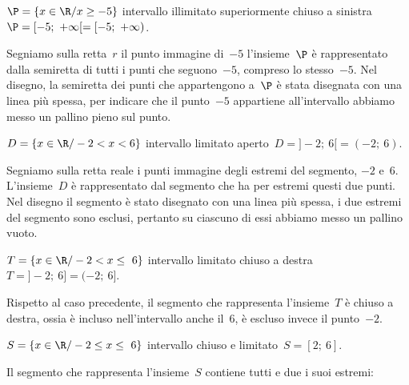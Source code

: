 \begin{esempio}{}{}
\(\P=\{x\in \R/x\ge -5\}\) intervallo illimitato superiormente chiuso 
a sinistra~\(\P = [-5;~+\infty[ = [-5;~+\infty)\).

Segniamo sulla retta~\(r\) il punto immagine di~\(-5\)
l'insieme~\(\P\) è rappresentato dalla semiretta di tutti
i punti che seguono~\(-5\), compreso lo stesso~\(-5\). Nel disegno, la
semiretta dei punti che appartengono a~\(\P\) è stata disegnata con una
linea più spessa, per indicare che il punto~\(-5\) appartiene
all'intervallo abbiamo messo un pallino pieno sul punto.
\vspace{-.5em}
\begin{center}
\end{center}
\end{esempio}

\begin{esempio}{}{}
 \(D=\{x\in \R/-2<x<6\}\) intervallo limitato 
 aperto~\(D = ]-2;~6[ = (-2;~6)\).

Segniamo sulla retta reale i punti immagine degli estremi del segmento,
\(-2\) e~6. L'insieme~\(D\) è rappresentato dal segmento che
ha per estremi questi due punti. Nel disegno il segmento è stato
disegnato con una linea più spessa, i due estremi del segmento sono
esclusi, pertanto su ciascuno di essi abbiamo messo un pallino vuoto.
\vspace{-.5em}
\begin{center}
\end{center}
\end{esempio}

\begin{esempio}{}{}
\(T=\{x\in \R/-2<x\le~6\}\) intervallo limitato chiuso a 
destra~\(T = ]-2;~6] = (-2;~6]\).

Rispetto al caso precedente, il segmento che rappresenta
l'insieme~\(T\) è chiuso a destra, ossia è incluso
nell'intervallo anche il~6, è escluso invece il
punto~\(-2\).
\vspace{-.5em}
\begin{center}
\end{center}
\end{esempio}

\begin{esempio}{}{}
\(S=\{x\in \R/-2\le x\le~6\}\) intervallo chiuso e 
limitato~\(S = [2;~6]\).

Il segmento che rappresenta l'insieme~\(S\) contiene tutti e
due i suoi estremi:
\vspace{-.5em}
\begin{center}
\end{center}
\end{esempio}

